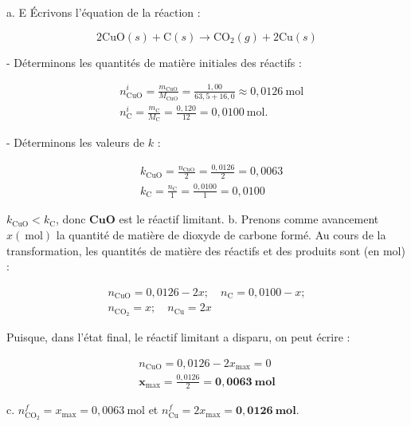 a. E Écrivons l'équation de la réaction :

$$
2 \mathrm{CuO}(s)+\mathrm{C}(s) \longrightarrow \mathrm{CO}_2(g)+2 \mathrm{Cu}(s)
$$

- Déterminons les quantités de matière initiales des réactifs :

$$
\begin{aligned}
& n_{\mathrm{CuO}}^i=\frac{m_{\mathrm{CuO}}}{M_{\mathrm{CuO}}}=\frac{1,00}{63,5+16,0} \approx 0,0126 \mathrm{~mol} \\
& n_{\mathrm{C}}^i=\frac{m_{\mathrm{C}}}{M_{\mathrm{C}}}=\frac{0,120}{12}=0,0100 \mathrm{~mol} .
\end{aligned}
$$

- Déterminons les valeurs de $k$ :

$$
\begin{aligned}
& k_{\mathrm{CuO}}=\frac{n_{\mathrm{CuO}}}{2}=\frac{0,0126}{2}=0,0063 \\
& k_{\mathrm{C}}=\frac{n_{\mathrm{C}}}{1}=\frac{0,0100}{1}=0,0100
\end{aligned}
$$

$k_{\mathrm{CuO}}<k_{\mathrm{C}}$, donc $\mathbf{C u O}$ est le réactif limitant.
b. Prenons comme avancement $x(\mathrm{~mol})$ la quantité de matière de dioxyde de carbone formé. Au cours de la transformation, les quantités de matière des réactifs et des produits sont (en mol) :

$$
\begin{gathered}
n_{\mathrm{CuO}}=0,0126-2 x ; \quad n_{\mathrm{C}}=0,0100-x ; \\
n_{\mathrm{CO}_2}=x ; \quad n_{\mathrm{Cu}}=2 x
\end{gathered}
$$


Puisque, dans l'état final, le réactif limitant a disparu, on peut écrire :

$$
\begin{gathered}
n_{\mathrm{CuO}}=0,0126-2 x_{\max }=0 \\
\boldsymbol{x}_{\max }=\frac{0,0126}{2}=\mathbf{0 , 0 0 6 3 ~ m o l}
\end{gathered}
$$

c. $n_{\mathrm{CO}_2}^f=x_{\max }=0,0063 \mathrm{~mol}$
et $n_{\mathrm{Cu}}^f=2 x_{\max }=\mathbf{0 , 0 1 2 6 ~ m o l}$.
